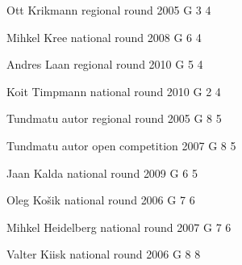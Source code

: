 \documentclass[11pt]{article}
\begin{document}
\ylDisplay{} %
{Ott Krikmann} %
{regional round} %
{2005} %
{G 3} %
{4} %
{

\ifEngStatement
\fi
}

\ylDisplay{} %
{Mihkel Kree} %
{national round} %
{2008} %
{G 6} %
{4} %
{

\ifEngStatement
\fi
}

\ylDisplay{} %
{Andres Laan} %
{regional round} %
{2010} %
{G 5} %
{4} %
{

\ifEngStatement
\fi
}

\ylDisplay{} %
{Koit Timpmann} %
{national round} %
{2010} %
{G 2} %
{4} %
{

\ifEngStatement
\fi
}

\ylDisplay{} %
{Tundmatu autor} %
{regional round} %
{2005} %
{G 8} %
{5} %
{

\ifEngStatement
\fi
}

\ylDisplay{} %
{Tundmatu autor} %
{open competition} %
{2007} %
{G 8} %
{5} %
{

\ifEngStatement
\fi
}

\ylDisplay{} %
{Jaan Kalda} %
{national round} %
{2009} %
{G 6} %
{5} %
{

\ifEngStatement
\fi
}

\ylDisplay{} %
{Oleg Košik} %
{national round} %
{2006} %
{G 7} %
{6} %
{

\ifEngStatement
\fi
}

\ylDisplay{} %
{Mihkel Heidelberg} %
{national round} %
{2007} %
{G 7} %
{6} %
{

\ifEngStatement
\fi
}

\ylDisplay{} %
{Valter Kiisk} %
{national round} %
{2006} %
{G 8} %
{8} %
{

\ifEngStatement
\fi
}
\end{document}
